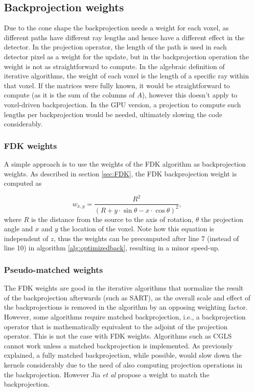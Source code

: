 \subsection{Backprojection weights}\label{sec:weights}

Due to the cone shape the backprojection needs a weight for each voxel, as different paths have different ray lengths and hence have a different effect in the detector. In the projection operator, the length of the path is used in each detector pixel as a weight for the update, but in the backprojection operation the weight is not as straightforward to compute. In the algebraic definition of iterative algorithms, the weight of each voxel is the length of a specific ray within that voxel. If the matrices were fully known, it would be straightforward to compute (as it is the sum of the columns of $A$), however this doesn't apply to voxel-driven backprojection. In the GPU version, a projection to compute such lengths per backprojection would be needed, ultimately slowing the code considerably.

\subsubsection*{FDK weights}
A simple approach is to use the weights of the FDK algorithm as backprojection weights. As described in section \ref{sec:FDK}, the FDK backprojection weight is computed as

\begin{equation}
w_{x,y}=\frac{R^2}{(R+y\cdot \sin\theta-x\cdot\cos\theta)^2},
\end{equation}
where $R$ is the distance from the source to the axis of rotation, $\theta$ the projection angle and $x$ and $y$ the location of the voxel. Note how this equation is independent of $z$, thus the weights can be precomputed after line 7 (instead of line 10) in algorithm \ref{alg:optimizedback}, resulting in a minor speed-up.


\subsubsection*{Pseudo-matched weights}
The FDK weights are good in the iterative algorithms that normalize the result of the backprojection afterwards (such as SART), as the overall scale and effect of the backprojections is removed in the algorithm by an opposing weighting factor. However, some algorithms require matched backprojection, i.e., a backprojection operator that is mathematically equivalent to the adjoint of the projection operator. This is not the case with FDK weights. Algorithms such as CGLS cannot work unless a matched backprojection is implemented. As previously explained, a fully matched backprojection, while possible, would slow down the kernels considerably due to the need of also computing projection operations in the backprojection. However Jia \textit{et al}\cite{jia2011gpu} propose a weight to match the backprojection.

